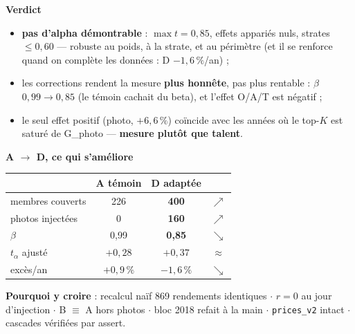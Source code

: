 \documentclass[10pt,a4paper,landscape]{article}
\begin{document}
\noindent\begin{minipage}[t]{0.47\textwidth}\vspace{0pt}
\textbf{\color{rouge}Verdict}
\begin{itemize}
\item[--] \textbf{pas d'alpha démontrable} : $\max t = 0{,}85$, effets appariés nuls, strates $\le 0{,}60$ --- robuste au poids, à la strate, et au périmètre (et il se renforce quand on complète les données : D $-1{,}6\,\%$/an) ;
\item[--] les corrections rendent la mesure \textbf{plus honnête}, pas plus rentable : $\beta$ $0{,}99 \to 0{,}85$ (le témoin cachait du beta), et l'effet O/A/T est négatif ;
\item[--] le seul effet positif (photo, $+6{,}6\,\%$) coïncide avec les années où le top-$K$ est saturé de G\_photo --- \textbf{mesure plutôt que talent}.
\end{itemize}

\vspace{1mm}
\textbf{A $\to$ D, ce qui s'améliore}
\begin{center}\small
\begin{tabular}{@{}lccc@{}}
\toprule
 & A témoin & D adaptée & \\
\midrule
membres couverts & 226 & \textbf{400} & $\nearrow$ \\
photos injectées & 0 & \textbf{160} & $\nearrow$ \\
$\beta$ & 0,99 & \textbf{0,85} & $\searrow$ \\
$t_{\alpha}$ ajusté & $+0{,}28$ & $+0{,}37$ & $\approx$ \\
excès/an & $+0{,}9\,\%$ & $-1{,}6\,\%$ & $\searrow$ \\
\bottomrule
\end{tabular}
\end{center}

\vspace{1mm}
\textbf{\color{grisf}Pourquoi y croire} {\scriptsize : recalcul naïf 869 rendements identiques $\cdot$ $r = 0$ au jour d'injection $\cdot$ B $\equiv$ A hors photos $\cdot$ bloc 2018 refait à la main $\cdot$ \texttt{prices\_v2} intact $\cdot$ cascades vérifiées par assert.}
\end{minipage}\hfill
\end{document}
